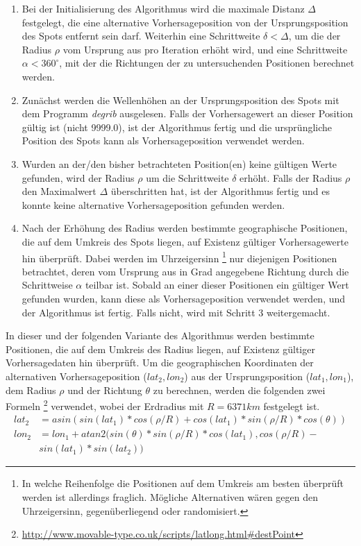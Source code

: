 \begin{enumerate}

\item Bei der Initialisierung des Algorithmus wird die maximale
  Distanz $\Delta$ festgelegt, die eine alternative Vorhersageposition
  von der Ursprungsposition des Spots entfernt sein darf. Weiterhin
  eine Schrittweite $\delta < \Delta$, um die der Radius $\rho$ vom
  Ursprung aus pro Iteration erhöht wird, und eine Schrittweite
  $\alpha < 360^{\circ}$, mit der die Richtungen der zu untersuchenden
  Positionen berechnet werden.

\item Zunächst werden die Wellenhöhen an der Ursprungsposition des
  Spots mit dem Programm \textit{degrib} ausgelesen. Falls der
  Vorhersagewert an dieser Position gültig ist (nicht 9999.0), ist der
  Algorithmus fertig und die ursprüngliche Position des Spots kann als
  Vorhersageposition verwendet werden.

\item Wurden an der/den bisher betrachteten Position(en) keine
  gültigen Werte gefunden, wird der Radius $\rho$ um die Schrittweite
  $\delta$ erhöht. Falls der Radius $\rho$ den Maximalwert $\Delta$
  überschritten hat, ist der Algorithmus fertig und es konnte keine
  alternative Vorhersageposition gefunden werden.

\item Nach der Erhöhung des Radius werden bestimmte geographische
  Positionen, die auf dem Umkreis des Spots liegen, auf Existenz
  gültiger Vorhersagewerte hin überprüft. Dabei werden im
  Uhrzeigersinn \footnote{In welche Reihenfolge die Positionen auf dem
    Umkreis am besten überprüft werden ist allerdings
    fraglich. Mögliche Alternativen wären gegen den Uhrzeigersinn,
    gegenüberliegend oder randomisiert.} nur diejenigen Positionen
  betrachtet, deren vom Ursprung aus in Grad angegebene Richtung durch
  die Schrittweise $\alpha$ teilbar ist. Sobald an einer dieser
  Positionen ein gültiger Wert gefunden wurden, kann diese als
  Vorhersageposition verwendet werden, und der Algorithmus ist
  fertig. Falls nicht, wird mit Schritt 3 weitergemacht.

\end{enumerate}

In dieser und der folgenden Variante des Algorithmus werden bestimmte
Positionen, die auf dem Umkreis des Radius liegen, auf Existenz
gültiger Vorhersagedaten hin überprüft. Um die geographischen
Koordinaten der alternativen Vorhersageposition ($lat_2,lon_2$) aus
der Ursprungsposition ($lat_1,lon_1$), dem Radius $\rho$ und der
Richtung $\theta$ zu berechnen, werden die folgenden zwei Formeln
\footnote{\url{http://www.movable-type.co.uk/scripts/latlong.html\#destPoint}}
verwendet, wobei der Erdradius mit $R = 6371 km$ festgelegt ist.
\begin{align*}
  lat_2 & = asin(sin(lat_1)*cos(\rho/R) + cos(lat_1)*sin(\rho/R)*cos(\theta)) \\
  lon_2 & = lon_1 + atan2(sin(\theta)*sin(\rho/R)*cos(lat_1), cos(\rho/R)- \\ & sin(lat_1)*sin(lat_2))
\end{align*}

